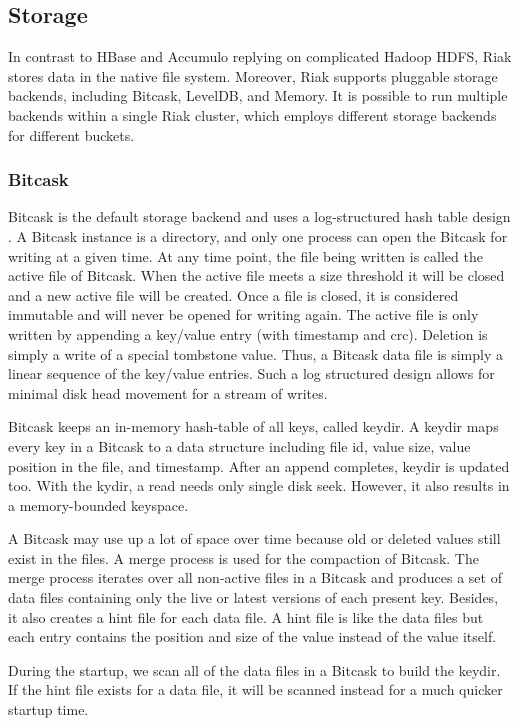 \documentclass[11pt]{book}
\begin{document}
\subsection{Storage}

In contrast to HBase and Accumulo replying on complicated Hadoop HDFS, Riak stores data in the native file system. Moreover, Riak supports pluggable storage backends, including Bitcask, LevelDB, and Memory. It is possible to run multiple backends within a single Riak cluster, which employs different storage backends for different buckets. 

\subsubsection{Bitcask}
Bitcask is the default storage backend and uses a log-structured hash table design \cite{Bitcask}. A Bitcask instance is a directory, and only one process can open the Bitcask for writing at a given time. At any time point, the file being written is called the active file of Bitcask. When the active file meets a size threshold it will be closed and a new active file will be created. Once a file is closed, it is considered immutable and will never be opened for writing again. The active file is only written by appending a key/value entry (with timestamp and crc). Deletion is simply a write of a special tombstone value. Thus, a Bitcask data file is simply a linear sequence of the key/value entries. Such a log structured design allows for minimal disk head movement for a stream of writes.

Bitcask keeps an in-memory hash-table of all keys, called keydir. A keydir maps every key in a Bitcask to a data structure including file id, value size, value position in the file, and timestamp. After an append completes, keydir is updated too.
With the kydir, a read needs only single disk seek. However, it also results in a memory-bounded keyspace.

A Bitcask may use up a lot of space over time because old or deleted values still exist in the files. A merge process is used for the compaction of Bitcask. The merge process iterates over all non-active files in a Bitcask and produces a set of data files containing only the live or latest versions of each present key. Besides, it also creates a hint file for each data file. A hint file is like the data files but each entry contains the position and size of the value instead of the value itself.

During the startup, we scan all of the data files in a Bitcask to build the keydir. If the hint file exists for a data file, it will be scanned instead for a much quicker startup time.
\end{document}
